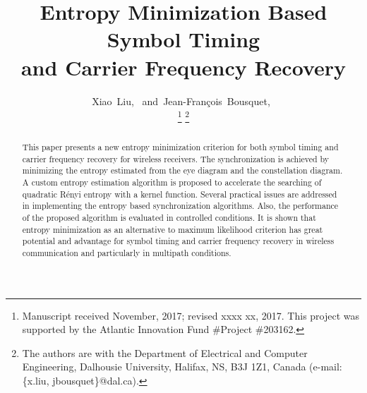 \documentclass[12pt, draftclsnofoot, onecolumn]{IEEEtran}
\begin{document}
%

\title{Entropy Minimization Based Symbol Timing
\\and Carrier Frequency Recovery}
\author{Xiao~Liu,~
        and~Jean-Fran\c{c}ois~Bousquet,~%

\thanks{Manuscript received November, 2017; revised xxxx xx, 2017. This project was supported by the Atlantic Innovation Fund \#Project \#203162.}
\thanks{The authors are with the Department of Electrical and Computer Engineering, Dalhousie University, Halifax,
NS, B3J 1Z1, Canada (e-mail: \{x.liu, jbousquet\}@dal.ca).}%
}


\maketitle


\begin{abstract}
This paper presents a new entropy minimization criterion for both symbol timing and carrier frequency recovery for  wireless receivers.
The synchronization is achieved by minimizing the entropy estimated from the eye diagram and the constellation diagram. 
A custom entropy estimation algorithm is proposed to accelerate the searching of quadratic R\'enyi entropy with a kernel function.
Several practical issues are addressed in implementing the entropy based synchronization algorithms.
Also, the performance of the proposed algorithm is evaluated in controlled conditions.
It is shown that entropy minimization as an alternative to maximum likelihood criterion has great potential and advantage for symbol timing and carrier frequency recovery in wireless communication and particularly in multipath conditions.


\end{abstract}
\end{document}
